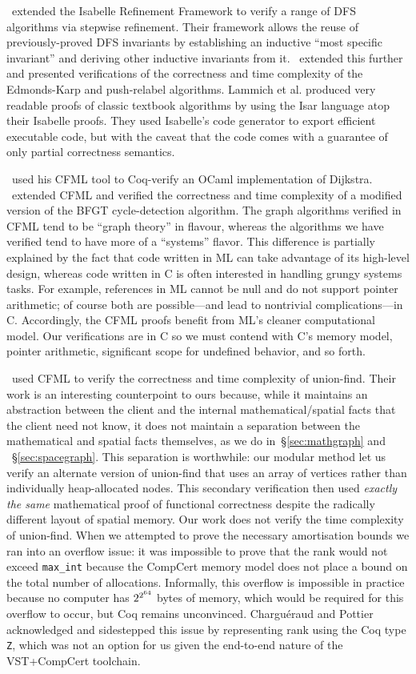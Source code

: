 \documentclass[acmsmall,screen]{acmart}
\newcommand{\li}[1]{{\texttt{\small #1}}}
\begin{document}
\citet{lamneu15}~extended the Isabelle Refinement Framework to verify a range of 
DFS algorithms via stepwise refinement.
Their framework allows the reuse of previously-proved DFS 
invariants by establishing an inductive
``most specific invariant'' and deriving other inductive invariants from it.
\citet{lamsef19}~extended this further and presented verifications of 
the correctness and time complexity of the Edmonds-Karp and push-relabel
algorithms. Lammich et al. produced very readable proofs of classic 
textbook algorithms by using the Isar language atop their Isabelle proofs.
They used Isabelle's code generator to export efficient executable code, 
but with the caveat that the code comes with a guarantee of only 
partial correctness semantics.

\citet{char11}~used his CFML tool to Coq-verify an OCaml implementation of 
Dijkstra. 
\citet{gueneauetal19}~extended CFML and verified the correctness 
and time complexity of a modified version of the BFGT cycle-detection algorithm.
The graph algorithms verified in CFML tend to be ``graph theory'' in flavour, 
whereas the algorithms we have verified tend to have more of a
``systems'' flavor. This difference is partially explained by the fact that 
code written in ML can take advantage of its high-level design, whereas
code written in C is often interested in handling grungy systems tasks. For 
example, references in ML cannot be null and do not support pointer arithmetic; 
of course both are possible---and lead to nontrivial complications---in 
C. Accordingly, the CFML proofs benefit from ML’s cleaner computational model. 
Our verifications are in C so we must contend with C’s memory model, pointer 
arithmetic, significant scope for undefined behavior, and so forth.

\citet{charpott15, charpott19}~used CFML to verify the correctness and 
time complexity of union-find. Their work is an interesting counterpoint to 
ours because, while it maintains an abstraction between the client and the 
internal mathematical/spatial facts that the client need not know, it does 
not maintain a separation between the mathematical and spatial 
facts themselves, as we do in~\S\ref{sec:mathgraph} and ~\S\ref{sec:spacegraph}.
This separation is worthwhile: our modular method let us verify an alternate 
version of union-find that uses an array of vertices rather than individually 
heap-allocated nodes. This 
secondary verification then used \emph{exactly the same} mathematical proof of 
functional correctness despite the radically different layout of spatial 
memory.
Our work does not verify the time complexity of union-find. When 
we attempted to prove the necessary amortisation bounds we ran into an 
overflow issue: it was impossible to prove that the rank would not exceed 
\li{max\_int} because the CompCert memory model does not place a bound on the 
total number of allocations. Informally, this overflow is impossible in 
practice because no computer has $2^{2^{\tiny 64}}$ bytes of memory, which would 
be required for this overflow to occur, but Coq remains unconvinced. 
Chargu{\'{e}}raud and Pottier acknowledged and sidestepped this issue by 
representing rank using the Coq type \li{Z}, which was not an option for us 
given the end-to-end nature of the VST+CompCert toolchain.
\end{document}
